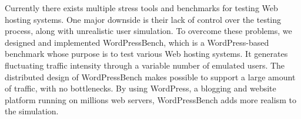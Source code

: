 
Currently there exists multiple stress tools and benchmarks for testing Web hosting systems. One major downside is their lack of control over the testing process, along with unrealistic user simulation. To overcome these problems, we designed and implemented WordPressBench, which is a WordPress-based benchmark whose purpose is to test various Web hosting systems. It generates fluctuating traffic intensity through a variable number of emulated users. The distributed design of WordPressBench makes possible to support a large amount of traffic, with no bottlenecks. By using WordPress, a blogging and website platform running on millions web servers, WordPressBench adds more realism to the simulation.
